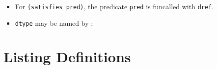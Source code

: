 \begin{itemize}
\begin{itemize}
\begin{Shaded}
\begin{Highlighting}[]
\OperatorTok{\#\textquotesingle{}}\NormalTok{ ,}\OperatorTok{\#\textquotesingle{}}
\OperatorTok{=\textgreater{}}
\end{Highlighting}
\end{Shaded}
  \item
    For \texttt{(satisfies\ pred)}, the predicate \texttt{pred} is
    funcalled with \texttt{dref}.
  \item
    \texttt{dtype} may be named by
    :

\begin{Shaded}
\begin{Highlighting}[]
\OperatorTok{\#\textquotesingle{}}\NormalTok{)}
\OperatorTok{=\textgreater{}}
\end{Highlighting}
\end{Shaded}
  \end{itemize}
\end{itemize}

\section{Listing Definitions}\label{listing-definitions}

\label{x-28DREF-3A-40LISTING-DEFINITIONS-20MGL-PAX-3ASECTION-29}

